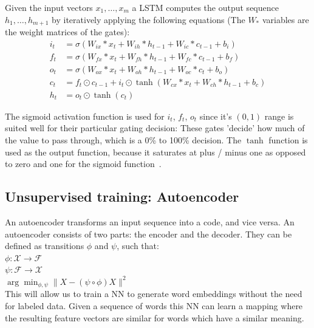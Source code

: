 Given the input vectors $x_1,\dots,x_m$ a LSTM computes the output sequence $h_1,\dots, h_{m+1}$ by iteratively applying the
following equations (The $W_*$ variables are the weight matrices of the gates):
\begin{equation}
\begin{aligned}  
  i_t &=\sigma(W_{ix} * x_t  + W_{ih} * h_{t-1} + W_{ic} * c_{t-1} + b_i) \\  
  f_t &=\sigma(W_{fx} * x_t  + W_{fh} * h_{t-1} + W_{fc} * c_{t-1} + b_f) \\
  o_t &=\sigma(W_{ox} * x_t  + W_{oh} * h_{t-1} + W_{oc} * c_t + b_o) \\  
  c_t &= f_t \odot c_{t-1} + i_t \odot \tanh(W_{cx} * x_t  + W_{ch} * h_{t-1} + b_c) \\ 
  h_t &= o_t \odot \tanh(c_t) 
\end{aligned}
\end{equation}

The sigmoid activation function is used for $i_t$, $f_t$, $o_t$ since it's $(0, 1)$ range is suited well for their particular gating decision: 
These gates 'decide' how much of the value to pass through, which is a 0\% to 100\% decision.
The $\tanh$ function is used as the output function, because it saturates at plus / minus one as opposed to zero and one for the sigmoid
function~\cite{Glorot10understandingthe}.


\subsection{Unsupervised training: Autoencoder}

An autoencoder transforms an input sequence into a code, and vice versa. 
An autoencoder consists of two parts: the encoder and the decoder. They can be defined as transitions $\phi$ and $\psi$, such that:\\
$\phi:\mathcal{X} \rightarrow \mathcal{F}$\\
$\psi:\mathcal{F} \rightarrow \mathcal{X}$\\
$\arg \min_{\phi,\psi} \|X-(\psi \circ \phi) X\|^2$\\
This will allow us to train a NN to generate word embeddings without the need for labeled data.
Given a sequence of words this NN can learn a mapping where the resulting feature vectors are similar for words which have a similar meaning. 

